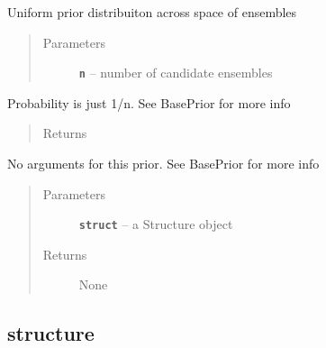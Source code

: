 \documentclass[letterpaper,10pt,english]{sphinxmanual}
\begin{document}
\begin{fulllineitems}
\label{modules:priors.UniformPrior}
Uniform prior distribuiton across space of ensembles
\begin{quote}\begin{description}
\item[{Parameters}] \leavevmode
\textbf{\texttt{n}} -- number of candidate ensembles

\end{description}\end{quote}

\begin{fulllineitems}
\label{modules:priors.UniformPrior.calc_prior_logp}
Probability is just 1/n. See BasePrior for more info
\begin{quote}\begin{description}
\item[{Returns}] \leavevmode


\end{description}\end{quote}

\end{fulllineitems}


\begin{fulllineitems}
\label{modules:priors.UniformPrior.get_arg}
No arguments for this prior. See BasePrior for more info
\begin{quote}\begin{description}
\item[{Parameters}] \leavevmode
\textbf{\texttt{struct}} -- a Structure object

\item[{Returns}] \leavevmode
None

\end{description}\end{quote}

\end{fulllineitems}


\end{fulllineitems}



\subsection{structure}
\label{modules:module-structure}\label{modules:structure}
\end{document}
